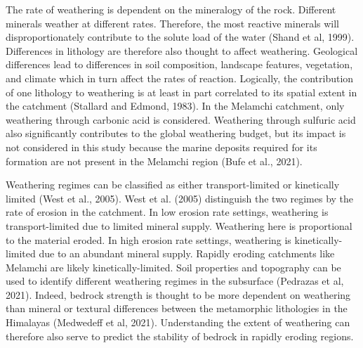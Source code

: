 \bsk

The rate of weathering is dependent on the mineralogy of the rock. Different minerals weather at different rates. Therefore, the most reactive minerals will disproportionately contribute to the solute load of the water (Shand et al, 1999). Differences in lithology are therefore also thought to affect weathering. Geological differences lead to differences in soil composition, landscape features, vegetation, and climate which in turn affect the rates of reaction. Logically, the contribution of one lithology to weathering is at least in part correlated to its spatial extent in the catchment (Stallard and Edmond, 1983). In the Melamchi catchment, only weathering through carbonic acid is considered. Weathering through sulfuric acid also significantly contributes to the global weathering budget, but its impact is not considered in this study because the marine deposits required for its formation are not present in the Melamchi region (Bufe et al., 2021).

\bsk


Weathering regimes can be classified as either transport-limited or kinetically limited (West et al., 2005). West et al. (2005) distinguish the two regimes by the rate of erosion in the catchment. In low erosion rate settings, weathering is transport-limited due to limited mineral supply. Weathering here is proportional to the material eroded. In high erosion rate settings, weathering is kinetically-limited due to an abundant mineral supply. Rapidly eroding catchments like Melamchi are likely kinetically-limited. Soil properties and topography can be used to identify different weathering regimes in the subsurface (Pedrazas et al, 2021). Indeed, bedrock strength is thought to be more dependent on weathering than mineral or textural differences between the metamorphic lithologies in the Himalayas (Medwedeff et al, 2021). Understanding the extent of weathering can therefore also serve to predict the stability of bedrock in rapidly eroding regions. 

\bsk


